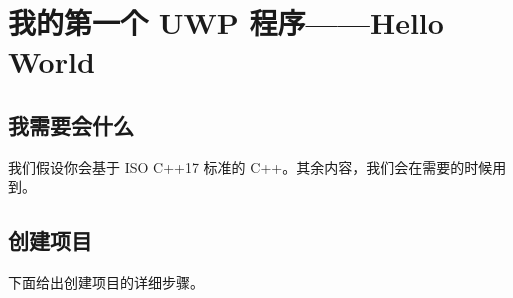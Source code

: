 




\section{我的第一个 UWP 程序——Hello World}

\subsection{我需要会什么}

我们假设你会基于 ISO C++17 标准的 C++。其余内容，我们会在需要的时候用到。

\subsection{创建项目}

下面给出创建项目的详细步骤。


